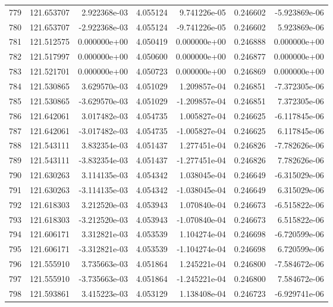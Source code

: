 \begin{tabular}{rrrrrrr}
 779 & 121.653707 &  2.922368e-03 &  4.055124 &  9.741226e-05 &    0.246602 & -5.923869e-06 \\
 780 & 121.653707 & -2.922368e-03 &  4.055124 & -9.741226e-05 &    0.246602 &  5.923869e-06 \\
 781 & 121.512575 &  0.000000e+00 &  4.050419 &  0.000000e+00 &    0.246888 &  0.000000e+00 \\
 782 & 121.517997 &  0.000000e+00 &  4.050600 &  0.000000e+00 &    0.246877 &  0.000000e+00 \\
 783 & 121.521701 &  0.000000e+00 &  4.050723 &  0.000000e+00 &    0.246869 &  0.000000e+00 \\
 784 & 121.530865 &  3.629570e-03 &  4.051029 &  1.209857e-04 &    0.246851 & -7.372305e-06 \\
 785 & 121.530865 & -3.629570e-03 &  4.051029 & -1.209857e-04 &    0.246851 &  7.372305e-06 \\
 786 & 121.642061 &  3.017482e-03 &  4.054735 &  1.005827e-04 &    0.246625 & -6.117845e-06 \\
 787 & 121.642061 & -3.017482e-03 &  4.054735 & -1.005827e-04 &    0.246625 &  6.117845e-06 \\
 788 & 121.543111 &  3.832354e-03 &  4.051437 &  1.277451e-04 &    0.246826 & -7.782626e-06 \\
 789 & 121.543111 & -3.832354e-03 &  4.051437 & -1.277451e-04 &    0.246826 &  7.782626e-06 \\
 790 & 121.630263 &  3.114135e-03 &  4.054342 &  1.038045e-04 &    0.246649 & -6.315029e-06 \\
 791 & 121.630263 & -3.114135e-03 &  4.054342 & -1.038045e-04 &    0.246649 &  6.315029e-06 \\
 792 & 121.618303 &  3.212520e-03 &  4.053943 &  1.070840e-04 &    0.246673 & -6.515822e-06 \\
 793 & 121.618303 & -3.212520e-03 &  4.053943 & -1.070840e-04 &    0.246673 &  6.515822e-06 \\
 794 & 121.606171 &  3.312821e-03 &  4.053539 &  1.104274e-04 &    0.246698 & -6.720599e-06 \\
 795 & 121.606171 & -3.312821e-03 &  4.053539 & -1.104274e-04 &    0.246698 &  6.720599e-06 \\
 796 & 121.555910 &  3.735663e-03 &  4.051864 &  1.245221e-04 &    0.246800 & -7.584672e-06 \\
 797 & 121.555910 & -3.735663e-03 &  4.051864 & -1.245221e-04 &    0.246800 &  7.584672e-06 \\
 798 & 121.593861 &  3.415223e-03 &  4.053129 &  1.138408e-04 &    0.246723 & -6.929741e-06 \\

\end{tabular}
